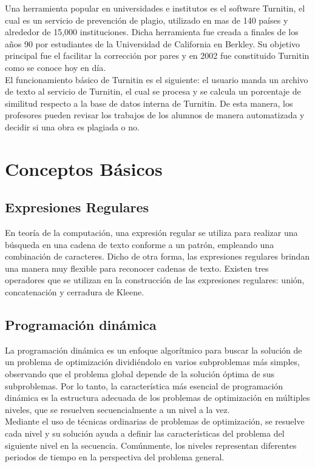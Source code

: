 \documentclass[12pt,twoside]{article}
\begin{document}
    Una herramienta popular en universidades e institutos es el software Turnitin, el cual es un servicio de prevención de plagio, utilizado en mas de 140 países y alrededor de 15,000 instituciones. Dicha herramienta fue creada a finales de los años 90 por estudiantes de la Universidad de California en Berkley. Su objetivo principal fue el facilitar la corrección por pares y en 2002 fue constituido Turnitin como se conoce hoy en día.\\

    El funcionamiento básico de Turnitin es el siguiente: el usuario manda un archivo de texto al servicio de Turnitin, el cual se procesa y se calcula un porcentaje de similitud respecto a la base de datos interna de Turnitin. De esta manera, los profesores pueden revisar los trabajos de los alumnos de manera automatizada y decidir si una obra es plagiada o no.
    
\section{Conceptos B\'asicos}
    \subsection{Expresiones Regulares}
        En teoría de la computación, una expresión regular se utiliza para realizar una búsqueda en una cadena de texto conforme a un patrón, empleando una combinación de caracteres. Dicho de otra forma, las expresiones regulares brindan una manera muy flexible para reconocer cadenas de texto.
        Existen tres operadores que se utilizan en la construcción de las expresiones regulares: unión, concatenación y cerradura de Kleene.
        
    \subsection{Programaci\'on din\'amica}
        La programación dinámica es un enfoque algorítmico para buscar la solución de un problema de optimización dividiéndolo en varios subproblemas más simples, observando que el problema global depende de la solución óptima de sus subproblemas. Por lo tanto, la característica más esencial de programación dinámica es la estructura adecuada de los problemas de optimización en múltiples niveles, que se resuelven secuencialmente a un nivel a la vez.\\ Mediante el uso de técnicas ordinarias de problemas de optimización, se resuelve cada nivel y su solución ayuda a definir las características del problema del siguiente nivel en la secuencia. Comúnmente, los niveles representan diferentes periodos de tiempo en la perspectiva del problema general.
        \\
\end{document}
